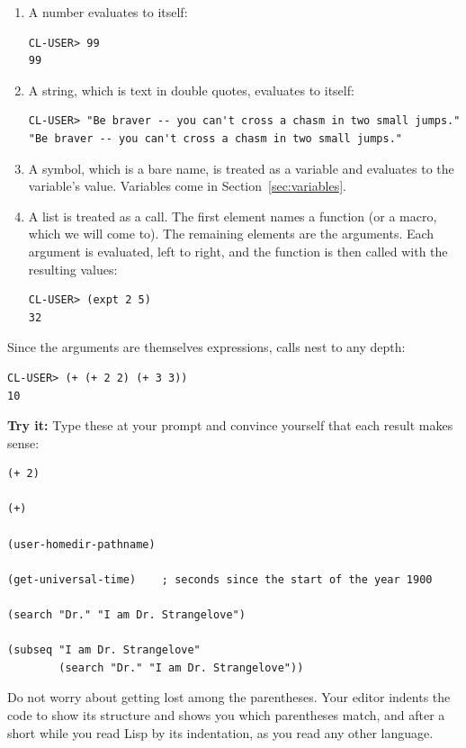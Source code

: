 \begin{enumerate}
\item A number evaluates to itself:

\begin{verbatim}
CL-USER> 99
99
\end{verbatim}

\item A string, which is text in double quotes, evaluates to itself:

\begin{verbatim}
CL-USER> "Be braver -- you can't cross a chasm in two small jumps."
"Be braver -- you can't cross a chasm in two small jumps."
\end{verbatim}

\item A symbol, which is a bare name, is treated as a variable and
evaluates to the variable's value. Variables come in
Section~\ref{sec:variables}.

\item A list is treated as a call. The first element names a function
(or a macro, which we will come to). The remaining elements are the
arguments. Each argument is evaluated, left to right, and the
function is then called with the resulting values:

\begin{verbatim}
CL-USER> (expt 2 5)
32
\end{verbatim}
\end{enumerate}

Since the arguments are themselves expressions, calls nest to any
depth:

\begin{verbatim}
CL-USER> (+ (+ 2 2) (+ 3 3))
10
\end{verbatim}

\textbf{Try it:} Type these at your prompt and convince yourself that
each result makes sense:

\begin{verbatim}
(+ 2)

(+)

(user-homedir-pathname)

(get-universal-time)    ; seconds since the start of the year 1900

(search "Dr." "I am Dr. Strangelove")

(subseq "I am Dr. Strangelove"
        (search "Dr." "I am Dr. Strangelove"))
\end{verbatim}

Do not worry about getting lost among the parentheses. Your editor
indents the code to show its structure and shows you which parentheses
match, and after a short while you read Lisp by its indentation, as
you read any other language.

